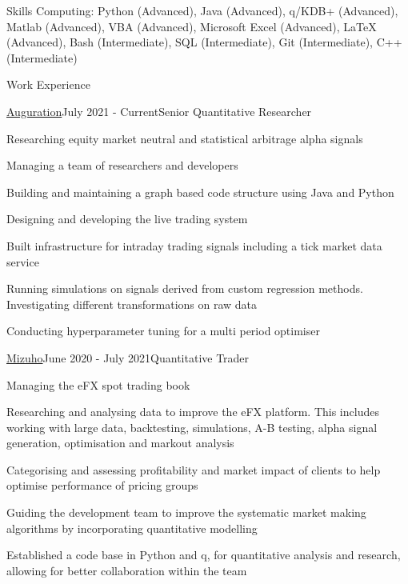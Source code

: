\documentclass{resume} %
\begin{document}
\begin{rSection}{Skills}
	Computing: Python (Advanced), Java (Advanced), q/KDB+ (Advanced), Matlab (Advanced), VBA (Advanced), Microsoft Excel (Advanced), LaTeX (Advanced), Bash (Intermediate), SQL (Intermediate), Git (Intermediate), C++ (Intermediate)
\end{rSection}
\begin{rSection}{Work Experience}
\begin{rSubsection}{\href{https://www.auguration.com/}{Auguration}}{July 2021 - Current}{Senior Quantitative Researcher}{}
	\item Researching equity market neutral and statistical arbitrage alpha signals
	\item Managing a team of researchers and developers
	\item Building and maintaining a graph based code structure using Java and Python
	\item Designing and developing the live trading system
	\item Built infrastructure for intraday trading signals including a tick market data service
	\item Running simulations on signals derived from custom regression methods. Investigating different transformations on raw data
	\item Conducting hyperparameter tuning for a multi period optimiser
\end{rSubsection}
\begin{rSubsection}{\href{https://www.mizuhogroup.com/bank/}{Mizuho}}{June 2020 - July 2021}{Quantitative Trader}{}
	\item Managing the eFX spot trading book
	\item Researching and analysing data to improve the eFX platform. This includes working with large data, backtesting, simulations, A-B testing, alpha signal generation, optimisation and markout analysis 
	\item Categorising and assessing profitability and market impact of clients to help optimise performance of pricing groups	 
	\item Guiding the development team to improve the systematic market making algorithms by incorporating quantitative modelling
	\item Established a code base in Python and q, for quantitative analysis and research, allowing for better collaboration within the team		

\end{rSubsection}
\end{rSection}
\end{document}
